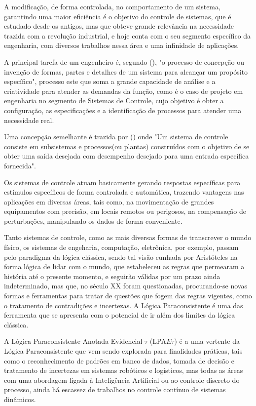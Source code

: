 A modificação, de forma controlada, no comportamento de um sistema, garantindo uma maior eficiência é o objetivo do controle de sistemas, que é estudado desde os antigos, mas que obteve grande relevância na necessidade trazida com a revolução industrial, e hoje conta com o seu segmento específico da engenharia, com diversos trabalhos nessa área e uma infinidade de aplicações. 
 

A principal tarefa de um engenheiro é, segundo \citeauthor{dorf2011modern}(\citeyear{dorf2011modern}), "o processo de concepção ou invenção de formas, partes e detalhes de um sistema para alcançar um propósito específico", processo este que soma a grande capacidade de análise e a criatividade para atender as demandas da função, como é o caso de projeto em engenharia no segmento de Sistemas de Controle, cujo objetivo é obter a configuração, as especificações e a identificação de processos para atender uma necessidade real. 


Uma concepção semelhante é trazida por \citeauthor{nise2009engenharia}(\citeyear{nise2009engenharia}) onde "Um sistema de controle consiste em subsistemas e processos(ou plantas) construídos com o objetivo de se obter uma saída desejada com desempenho desejado para uma entrada específica fornecida".


Os sistemas de controle atuam basicamente gerando respostas específicas para estímulos específicos de forma controlada e automática, trazendo vantagens nas aplicações em diversas áreas, tais como, 
na movimentação de grandes equipamentos com precisão, em locais remotos ou perigosos, na compensação de perturbações, manipulando os dados de forma conveniente.



Tanto sistemas de controle, como as mais diversas formas de transcrever o mundo físico, os sistemas de engeharia, computação, eletrônica, por exemplo, passam pelo paradigma da lógica clássica, sendo tal visão cunhada por Aristóteles na forma lógica de lidar com o mundo, que estabeleceu as regras que permearam a história até o presente momento, e seguirão válidas por um prazo ainda indeterminado, mas que, no século XX foram questionadas, procurando-se novas formas e ferramentas para tratar de questões que fogem das regras vigentes, como o tratamento de contradições e incertezas. A Lógica Paraconsistente é uma das ferramenta que se apresenta com o potencial de ir além dos limites da lógica clássica.

A Lógica Paraconsistente Anotada Evidencial $\tau$ (LPA$E\tau$) é a uma vertente da Lógica Paraconsistente que vem sendo explorada para finalidades práticas, tais como o reconhecimento de padrões em banco de dados, tomada de decisão e tratamento de incertezas em sistemas robóticos e logísticos, mas todas as áreas com uma abordagem ligada à Inteligência Artificial ou ao controle discreto do processo, ainda há escassez de trabalhos no controle contínuo de sistemas dinâmicos. 


